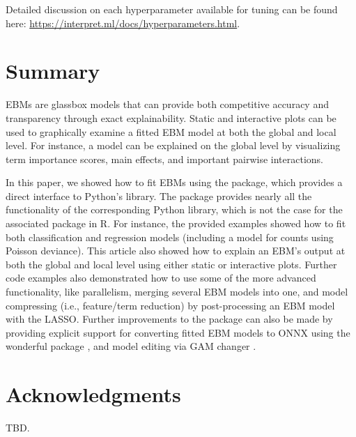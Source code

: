 Detailed discussion on each hyperparameter available for tuning can be
found here: \url{https://interpret.ml/docs/hyperparameters.html}.

\section{Summary}\label{summary}

EBMs are glassbox models that can provide both competitive accuracy and
transparency through exact explainability. Static and interactive plots
can be used to graphically examine a fitted EBM model at both the global
and local level. For instance, a model can be explained on the global
level by visualizing term importance scores, main effects, and important
pairwise interactions.

In this paper, we showed how to fit EBMs using the  package,
which provides a direct interface to Python's  library.
The  package provides nearly all the functionality of the
corresponding Python library, which is not the case for the associated
 package in R. For instance, the provided examples showed
how to fit both classification and regression models (including a model
for counts using Poisson deviance). This article also showed how to
explain an EBM's output at both the global and local level using either
static or interactive plots. Further code examples also demonstrated how
to use some of the more advanced functionality, like parallelism,
merging several EBM models into one, and model compressing (i.e.,
feature/term reduction) by post-processing an EBM model with the LASSO.
Further improvements to the  package can also be made by
providing explicit support for converting fitted EBM models to ONNX
\citep{onnx} using the wonderful  package
\citep{Py-ebm2onnx}, and model editing via GAM changer
\citep{Py-gamchanger}.

\section{Acknowledgments}\label{acknowledgments}

TBD.



\address{%
Brandon M. Greenwell\\
University of Cincinnati\\%
Department of Operations, Business Analytics, and Information
Systems\\ Cincinnati, Ohio\\
%
\url{https://github.com/bgreenwell}\\%
\textit{ORCiD: \href{https://orcid.org/0000-0002-8120-0084}{0000-0002-8120-0084}}\\%
\href{mailto:greenwb@ucmail.uc.edu}{\nolinkurl{greenwb@ucmail.uc.edu}}%
}
